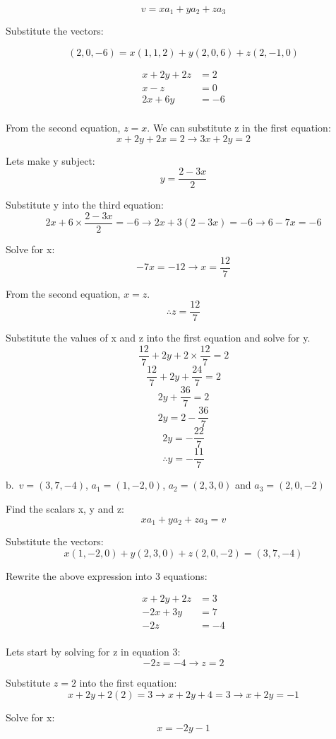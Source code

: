 \documentclass{book}
\begin{document}
\[v = x a_1 + y a_2 + z a_3\]

Substitute the vectors:

\[(2, 0, -6) = x (1, 1, 2) + y (2, 0, 6) + z (2, -1, 0)\]

\begin{align*}
	x + 2 y + 2 z &= 2 \\
	x - z &= 0 \\
	2 x + 6 y &= -6 \\
\end{align*}

From the second equation, \(z = x\). We can substitute z in the first equation:
\[x + 2 y + 2 x = 2 \rightarrow 3 x + 2 y = 2\]

Lets make y subject:
\[y = \frac{2 - 3x}{2}\]

Substitute y into the third equation:
\[2x + 6 \times \frac{2 - 3x}{2} = -6 \rightarrow 2x + 3 (2 - 3x) = -6 \rightarrow 6 - 7x = -6\]

Solve for x:
\[ - 7x = - 12 \rightarrow x = \frac{12}{7}\]

From the second equation, \(x = z\).
\[\therefore z = \frac{12}{7}\]

Substitute the values of x and z into the first equation and solve for y.
\[\frac{12}{7} + 2 y + 2 \times \frac{12}{7} = 2\]
\[\frac{12}{7} + 2 y + \frac{24}{7} = 2\]
\[2 y + \frac{36}{7} = 2\]
\[2 y = 2 - \frac{36}{7}\]
\[2 y = - \frac{22}{7}\]
\[\therefore y = - \frac{11}{7}\]

b.\, \(v = (3, 7, -4)\), \(a_1 = (1, -2, 0)\), \(a_2 = (2, 3, 0)\) and \(a_3 = (2, 0, -2)\)

Find the scalars x, y and z:
\[x a_1 + y a_2 + z a_3 = v\]

Substitute the vectors:
\[x (1, -2, 0) + y (2, 3, 0) + z (2, 0, -2) = (3, 7, -4)\]

Rewrite the above expression into 3 equations:

\begin{align*}
	x + 2 y + 2 z &= 3 \\
	-2 x + 3 y &= 7 \\
	-2 z &= -4 \\
\end{align*}

Lets start by solving for z in equation 3:
\[-2 z = -4 \rightarrow z = 2\]

Substitute \(z = 2\) into the first equation:
\[x + 2 y + 2 (2) = 3 \rightarrow x + 2 y + 4 = 3 \rightarrow x + 2 y = - 1\]

Solve for x:
\[x = - 2 y - 1\]
\end{document}
